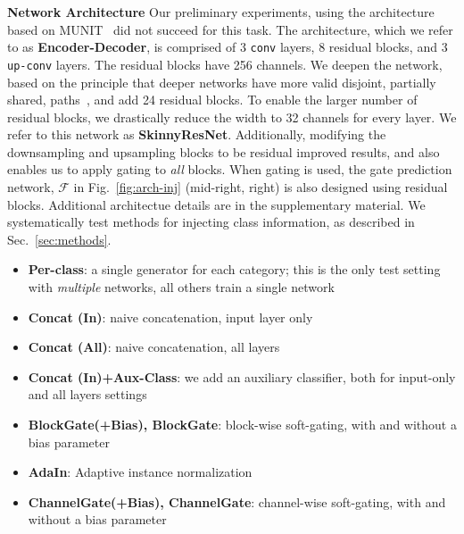 \vspace{2mm} \noindent \textbf{Network Architecture} Our preliminary experiments, using the architecture based on MUNIT~\cite{huang2018multimodal} did not succeed for this task. The architecture, which we refer to as \textbf{Encoder-Decoder}, is comprised of 3 \texttt{conv} layers, 8 residual blocks, and 3 \texttt{up-conv} layers. The residual blocks have 256 channels. We deepen the network, based on the principle that deeper networks have more valid disjoint, partially shared, paths~\cite{veit2016residual}, and add 24 residual blocks. To enable the larger number of residual blocks, we drastically reduce the width to 32 channels for every layer. We refer to this network as \textbf{SkinnyResNet}. Additionally, modifying the downsampling and upsampling blocks to be residual improved results, and also enables us to apply gating to {\em all} blocks. %
When gating is used, the gate prediction network, $\mathcal{F}$ in Fig.~\ref{fig:arch-inj} (mid-right, right) is also designed using residual blocks. Additional architectue details are in the supplementary material. 
We systematically test methods for injecting class information, as described in Sec.~\ref{sec:methods}. \begin{itemize}[noitemsep]
\item{\bf Per-class}: a single generator for each category; this is the only test setting with \textit{multiple} networks, all others train a single network
\item{\bf Concat (In)}: naive concatenation, input layer only
\item{\bf Concat (All)}: naive concatenation, all layers
\item{\bf Concat (In)+Aux-Class}: we add an auxiliary classifier, both for input-only and all layers settings
\item{\bf BlockGate(+Bias), BlockGate}: block-wise soft-gating, with and without a bias parameter
\item{\bf AdaIn}: Adaptive instance normalization
\item{\bf ChannelGate(+Bias), ChannelGate}: channel-wise soft-gating, with and without a bias parameter
\end{itemize}



